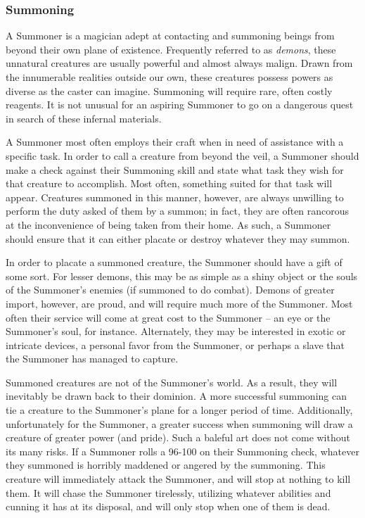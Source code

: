\documentclass[oneside]{book}
\begin{document}
\begin{multicols}{2}
\subsubsection{Summoning}
A Summoner is a magician adept at contacting and summoning beings from beyond their own plane of existence. Frequently referred to as \emph{demons}, these unnatural creatures are usually powerful and almost always malign. Drawn from the innumerable realities outside our own, these creatures possess powers as diverse as the caster can imagine. Summoning will require rare, often costly reagents. It is not unusual for an aspiring Summoner to go on a dangerous quest in search of these infernal materials.

A Summoner most often employs their craft when in need of assistance with a specific task. In order to call a creature from beyond the veil, a Summoner should make a check against their Summoning skill and state what task they wish for that creature to accomplish. Most often, something suited for that task will appear. Creatures summoned in this manner, however, are always unwilling to perform the duty asked of them by a summon; in fact, they are often rancorous at the inconvenience of being taken from their home. As such, a Summoner should ensure that it can either placate or destroy whatever they may summon. 

In order to placate a summoned creature, the Summoner should have a gift of some sort. For lesser demons, this may be as simple as a shiny object or the souls of the Summoner's enemies (if summoned to do combat). Demons of greater import, however, are proud, and will require much more of the Summoner. Most often their service will come at great cost to the Summoner -- an eye or the Summoner's soul, for instance. Alternately, they may be interested in exotic or intricate devices, a personal favor from the Summoner, or perhaps a slave that the Summoner has managed to capture. 

Summoned creatures are not of the Summoner's world. As a result, they will inevitably be drawn back to their dominion. A more successful summoning can tie a creature to the Summoner's plane for a longer period of time. Additionally, unfortunately for the Summoner, a greater success when summoning will draw a creature of greater power (and pride). Such a baleful art does not come without its many risks. If a Summoner rolls a 96-100 on their Summoning check, whatever they summoned is horribly maddened or angered by the summoning. This creature will immediately attack the Summoner, and will stop at nothing to kill them. It will chase the Summoner tirelessly, utilizing whatever abilities and cunning it has at its disposal, and will only stop when one of them is dead.


\end{multicols}
\end{document}
